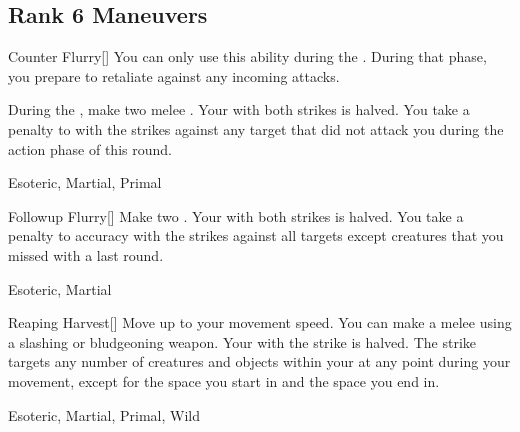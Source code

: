 \subsection{Rank 6 Maneuvers}

\lowercase{\hypertarget{maneuver:Counter Flurry}{}}\label{maneuver:Counter Flurry}
\hypertarget{maneuver:Counter Flurry}{}
\begin{freeability}[Rank 6]{Counter Flurry}[]
You can only use this ability during the .
During that phase, you prepare to retaliate against any incoming attacks.

During the , make two melee .
Your  with both strikes is halved.
You take a  penalty to  with the strikes against any target that did not attack you during the action phase of this round.


 Esoteric, Martial, Primal
\end{freeability}
\vspace{0.25em}



\lowercase{\hypertarget{maneuver:Followup Flurry}{}}\label{maneuver:Followup Flurry}
\hypertarget{maneuver:Followup Flurry}{}
\begin{freeability}[Rank 6]{Followup Flurry}[]
Make two .
Your  with both strikes is halved.
You take a  penalty to accuracy with the strikes against all targets except creatures that you missed with a  last round.


 Esoteric, Martial
\end{freeability}
\vspace{0.25em}



\lowercase{\hypertarget{maneuver:Reaping Harvest}{}}\label{maneuver:Reaping Harvest}
\hypertarget{maneuver:Reaping Harvest}{}
\begin{freeability}[Rank 6]{Reaping Harvest}[]
Move up to your movement speed.
You can make a melee  using a slashing or bludgeoning weapon.
Your  with the strike is halved.
The strike targets any number of creatures and objects within your  at any point during your movement, except for the space you start in and the space you end in.


 Esoteric, Martial, Primal, Wild
\end{freeability}
\vspace{0.25em}



